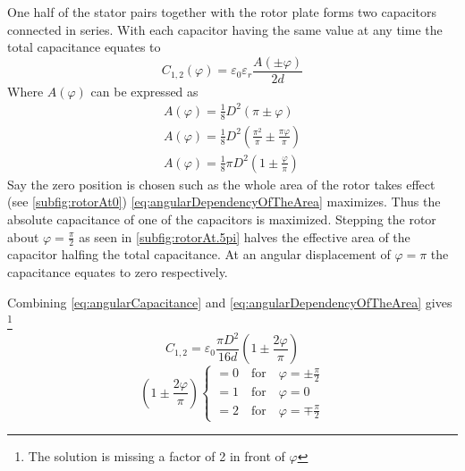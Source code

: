         One half of the stator pairs together with the rotor plate forms two capacitors connected in series. With each
        capacitor having the same value at any time the total capacitance equates to
        \begin{equation}
            C_{1,2}(\varphi) = \varepsilon_0 \varepsilon_r \frac{A(\pm\varphi)}{2d}
            \label{eq:angularCapacitance}
        \end{equation}
        Where \( A(\varphi) \) can be expressed as
        \begin{align}
            A(\varphi) = \frac{1}{8}D^2 \left( \pi \pm \varphi \right) \nonumber \\
            A(\varphi) = \frac{1}{8}D^2 \left( \frac{\pi^2}{\pi} \pm \frac{\pi\varphi}{\pi} \right) \nonumber \\
            A(\varphi) = \frac{1}{8} \pi D^2 \left( 1 \pm \frac{\varphi}{\pi}\right)
            \label{eq:angularDependencyOfTheArea}
        \end{align}
        Say the zero position is chosen such as the whole area of the rotor takes effect (see \cref{subfig:rotorAt0})
        \cref{eq:angularDependencyOfTheArea} maximizes. Thus the absolute capacitance of one of the capacitors is maximized.
        Stepping the rotor about \( \varphi = \frac{\pi}{2} \) as seen in \cref{subfig:rotorAt.5pi} halves the
        effective area of the capacitor halfing the total capacitance. At an angular displacement of \( \varphi = \pi \)
        the capacitance equates to zero respectively.\par
        Combining \cref{eq:angularCapacitance} and \cref{eq:angularDependencyOfTheArea} gives \footnote{The solution is missing a factor of 2 in front of \(\varphi\)}
        \begin{equation}
            C_{1,2} = \varepsilon_0 \frac{\pi D^2}{16d} \left( 1 \pm \frac{2\varphi}{\pi} \right)
        \end{equation}
        \begin{equation}
            \left(1 \pm \frac{2\varphi}{\pi} \right)
            \begin{cases}
                = 0 \quad \text{for} \quad \varphi = \pm \frac{\pi}{2} \nonumber \\
                = 1 \quad \text{for} \quad \varphi = 0 \nonumber \\
                = 2 \quad \text{for} \quad \varphi = \mp \frac{\pi}{2} \nonumber
            \end{cases}
        \end{equation}
